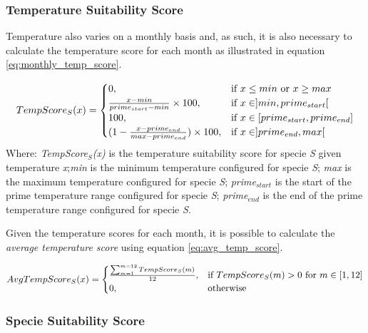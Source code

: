\subsubsection{Temperature Suitability Score}

Temperature also varies on a monthly basis and, as such, it is also necessary to calculate the temperature score for each month as illustrated in equation \ref{eq:monthly_temp_score}.

\begin{equation}
\centering
TempScore_{S}(x) = 
\begin{cases}
    0, & \text{if } x \leq min \text{ or } x \geq max \\
    \frac{x - min}{prime_{start} - min} \times 100, & \text{if } x \in ]min,prime_{start}[ \\
    100, & \text{if } x \in [prime_{start},prime_{end}] \\
    (1 - \frac{x - prime_{end}}{max-prime_{end}}) \times 100, & \text{if } x \in ]prime_{end},max[ \\
\end{cases}
\label{eq:monthly_temp_score}
\end{equation}
Where: \textit{TempScore$_{S}$(x)} is the temperature suitability score for specie \textit{S} given temperature \textit{x};\textit{min} is the minimum temperature configured for specie \textit{S}; \textit{max} is the maximum temperature configured for specie \textit{S}; \textit{prime$_{start}$} is the start of the prime temperature range configured for specie \textit{S};  \textit{prime$_{end}$} is the end of the prime temperature range configured for specie \textit{S}.

Given the temperature scores for each month, it is possible to calculate the \textit{average temperature score} using equation \ref{eq:avg_temp_score}.

\begin{equation}
\centering
AvgTempScore_{S}(x) =
\begin{cases}
	\frac{\sum_{m=1}^{m=12} TempScore_{S}(m)}{12}, & \text{if } TempScore_{S}(m) > 0 \text{ for } m \in [1,12] \\
    0,              & \text{otherwise}
\end{cases}
\label{eq:avg_temp_score}
\end{equation}

\subsubsection{Specie Suitability Score}


